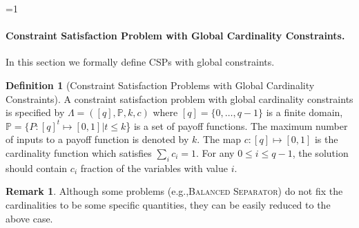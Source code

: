\documentclass[11pt]{article}
\def\full{1}
\theoremstyle{definition}
\newtheorem{definition}[theorem]{Definition}
\newtheorem{remark}[theorem]{Remark}
\newcommand{\eg}{e.g.,\xspace}
\newcommand{\problemmacro}[1]{\texorpdfstring{\textsc{#1}}{#1}\xspace}
\newcommand{\balancedseparator}{\problemmacro{Balanced Separator}}
\renewcommand{\leq}{\leqslant}
\numberwithin{equation}{section}
\let\origparagraph\paragraph
\renewcommand{\paragraph}[1]{\origparagraph{#1.}}
\begin{document}
\ifnum\full=1
\paragraph{Constraint Satisfaction Problem with Global Cardinality Constraints}

In this section we formally define CSPs with global constraints.

\begin{definition} [Constraint Satisfaction Problems with Global Cardinality Constraints]
A constraint satisfaction problem with global cardinality constraints is specified by $\Lambda=([q],\mathbb{P},k,c)$ where $[q]=\{0,\ldots,q-1\}$ is a finite domain, $\mathbb{P}=\{P:[q]^{t} \mapsto [0,1]|t\leq k$\} is a set of payoff functions. The maximum number of inputs to a payoff function is denoted by $k$. The map $c: [q]\mapsto [0,1]$ is the cardinality function which satisfies $\sum_{i} c_i=1$. For any $0\leq i\leq q-1$, the solution should contain $c_i$ fraction of the variables with value $i$.

\end{definition}
\begin{remark}
Although some problems (\eg \balancedseparator) do not fix the cardinalities to be some specific quantities, they can be easily reduced to the above case.
\end{remark}
\end{document}
